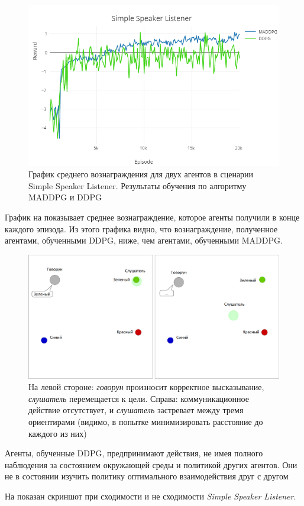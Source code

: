 \begin{figure}[ht!]
    \center
    \includegraphics [scale=0.60] {my_folder/images/ch5/ssl-rew.png}
    \caption{График среднего вознаграждения для двух агентов в сценарии Simple Speaker Listener. Результаты обучения по алгоритму MADDPG и DDPG}
    \label{fig:result-ssl-rew}
\end{figure}

График на  показывает среднее вознаграждение, которое агенты получили в конце каждого эпизода. Из этого графика видно, что вознаграждение, полученное агентами, обученными DDPG, ниже, чем агентами, обученными MADDPG.

\begin{figure}[ht!]
    \center
    \includegraphics [scale=0.45] {my_folder/images/ch5/results-ssl-conv-non-conv.png}
    \caption{На левой стороне: \textit{говорун} произносит корректное высказывание, \textit{слушатель} перемещается к цели. Справа: коммуникационное действие отсутствует, и \textit{слушатель} застревает между тремя ориентирами (видимо, в попытке минимизировать расстояние до каждого из них)}
    \label{fig:result-conv-non-conv}
\end{figure}

Агенты, обученные DDPG, предпринимают действия, не имея полного наблюдения за состоянием окружающей среды и политикой других агентов. Они не в состоянии изучить политику оптимального взаимодействия друг с другом

На  показан скриншот при сходимости и не сходимости \textit{Simple Speaker Listener}.
